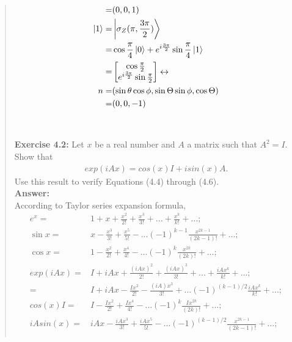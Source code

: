 \documentclass[UTF8]{ctexart}
\begin{document}
\begin{quote}
\begin{equation}
\begin{aligned}
		 =&(0,0,1)\\
		\ket{1}=&\ket{\sigma_{Z}(\pi,\frac{3\pi}{2})}\\
		=&\cos{\frac{\pi}{4}}\ket{0}+e^{i\frac{3\pi}{2}}\sin{\frac{\pi}{4}}\ket{1}  \\
		=&\begin{bmatrix}
			\cos{\frac{\pi}{2}} \\ e^{i\frac{3\pi}{2}}\sin{\frac{\pi}{2}}
		\end{bmatrix} \leftrightarrow \\
		n=&(\sin{\theta}\cos{\phi},\sin{\Theta}\sin{\phi},\cos{\Theta})\\
		 =&(0,0,-1)\\
	\end{aligned}
\end{equation}
\\
\\
\textbf{Exercise 4.2: }Let $x$ be a real number and $A$ a matrix such that $A^{2} = I$. Show that
\begin{equation}
	\begin{aligned}
		exp(iAx) = cos(x)I + isin(x)A.
	\end{aligned}
\end{equation}
Use this result to verify Equations (4.4) through (4.6).
\\
\textbf{Answer:}\\
According to Taylor series expansion formula, \\
\begin{equation}
	\begin{aligned}
		e^{x}=&1+x+\frac{x^{2}}{2!}+\frac{x^{3}}{3!}+...+\frac{x^{k}}{k!}+...;\\
		\sin{x}=&x-\frac{x^{3}}{3!}+\frac{x^{5}}{5!}-...(-1)^{k-1}\frac{x^{2k-1}}{(2k-1)!}+...;\\
		\cos{x}=&1-\frac{x^{2}}{2!}+\frac{x^{4}}{4!}-...(-1)^{k}\frac{x^{2k}}{(2k)!}+...;\\
		exp(iAx)=&I+iAx+\frac{(iAx)^{2}}{2!}+\frac{(iAx)^{3}}{3!}+...+\frac{iAx^{k}}{k!}+...;\\
				=&I+iAx-\frac{Ix^{2}}{2!}-\frac{(iA)x^{3}}{3!}+...(-1)^{(k-1)/2}\frac{iAx^{k}}{k!}+...;\\
		cos(x)I=&I-\frac{Ix^{2}}{2!}+\frac{Ix^{4}}{4!}-...(-1)^{k}\frac{Ix^{2k}}{(2k)!}+...;\\
		iAsin(x)=&iAx-\frac{iAx^{3}}{3!}+\frac{iAx^{5}}{5!}-...(-1)^{(k-1)/2}\frac{x^{2k-1}}{(2k-1)!}+...;\\
	\end{aligned}
\end{equation}

\end{quote}
\end{document}

